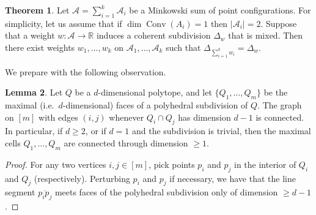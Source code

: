 \documentclass[11pt]{amsart}
\newcommand{\RR}{\mathbb R}
\newcommand{\PP}{\mathbb P}
\newcommand{\bu}{{\mathbf u}}
\theoremstyle{definition}
\newtheorem{thm}{Theorem}[subsection]
\newtheorem{lem}[thm]{Lemma}
\newcommand{\chris}[1]{{\color{cyan} \sf Chris: [#1]}}
\begin{document}
\begin{thm}\label{thm:mixed}
Let $\mathcal A = \sum_{i=1}^k \mathcal A_i$ be a Minkowski sum of point configurations.  For simplicity, let us assume that if $\dim \operatorname{Conv}(A_i) = 1$ then $|\mathcal A_i| = 2$. Suppose that a weight $w: \mathcal A\to \RR$ induces a coherent subdivision $\Delta_w$ that is mixed.  Then there exist weights $w_1, \ldots, w_k$ on $\mathcal A_1, \ldots, \mathcal A_k$ such that $\Delta_{\sum_{i=1}^k w_i} = \Delta_w$.
\end{thm}


We prepare with the following observation.

\begin{lem}\label{lem:connected}
Let $Q$ be a $d$-dimensional polytope, and let $\{Q_1, \ldots, Q_m\}$ be the maximal (i.e.\ $d$-dimensional) faces of a polyhedral subdivision of $Q$.  The graph on $[m]$ with edges $(i,j)$ whenever $Q_i \cap Q_j$ has dimension $d-1$ is connected.  In particular, if $d \geq 2$, or if $d=1$ and the subdivision is trivial, then the maximal cells $Q_1, \ldots, Q_m$ are connected through dimension $\geq 1$.
\end{lem}

\begin{proof}
For any two vertices $i,j\in [m]$, pick points $p_i$ and $p_j$ in the interior of $Q_i$ and $Q_j$ (respectively).  Perturbing $p_i$ and $p_j$ if necessary, we have that the line segment $\overline{p_ip_j}$ meets faces of the polyhedral subdivision only of dimension $\geq d-1$.
\end{proof}

\end{document}
